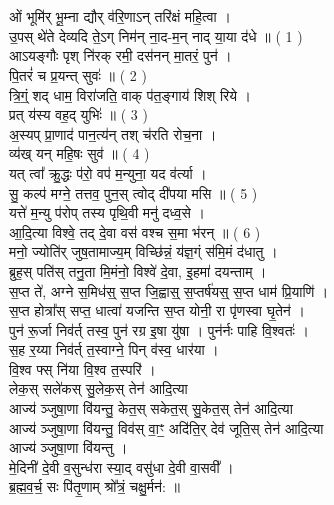 \section{}
ओं भूमि॑र् भू॒म्ना द्यौर् व॑रि॒णाऽन् तरि॑क्षं महि॒त्वा ।\\
उ॒पस् थे॑ते देव्यदि ते॒ऽग् निम॑न् ना॒द-म॒न् नाद् या॒या द॑धे ॥   ( 1 )\\
आऽयङ्गौः पृश् नि॑रक् रमी॒ दस॑नन् मा॒तरं॒ पुन॑ ।\\
पि॒तरं॑ च प्र॒यन्त् सुवः॑ ॥ ( 2 )\\
त्रि॒ग्ं॒ शद् धाम॒ विरा॑जति॒ वाक् प॑त॒ङ्गाय॑ शिश् रिये ।\\
प्रत् य॑स्य वह॒द् युभिः॑ ॥ ( 3 )\\
अ॒स्यप् प्रा॒णाद॑ पान॒त्य॑न् तश् च॑रति रोच॒ना ।\\
व्य॑ख् यन् महि॒षः सुव॑ ॥ ( 4 )\\
यत् त्वा᳚ क्रु॒द्धः प॑रो॒ वप॑ म॒न्युना॒ यद व॑र्त्या ।\\
सु॒ कल्प॑ मग्ने॒ तत्तव॒ पुन॒स् त्वोद् दी॑पया मसि ॥ ( 5 )\\
यत्ते॑ म॒न्यु प॑रोप् तस्य पृथि॒वी मनु॑ दध्व॒से ।\\
आ॒दि॒त्या विश्वे॒ तद् दे॒वा वस॑ वश्च स॒मा भ॑रन् ॥ ( 6 )\\
मनो॒ ज्योति॑र् जुष॒तामाज्य॒म् विच्छि॑न्नं॒ य॑ज्ञ॒ग्ं स॑मि॒मं द॑धातु ।\\
ब्रुह॒स् पति॑स् तनु॒ता मि॒मंनो॒ विश्वे॑ दे॒वा, इ॒हमा॑ दयन्ताम् ।\\
स॒प्त ते॑, अग्ने स॒मिध॑स्॒ स॒प्त जि॒ह्वास्॒ स॒प्तर्ष॑यस्॒ स॒प्त धाम॑ प्रि॒याणि॑ ।\\
स॒प्त होत्रा᳚स् सप्त॒ धात्वा॑ यजन्ति स॒प्त योनी॒ रा पृ॑णस्वा घृ॒तेन॑ ।\\
पुन॑ रू॒र्जा निव॑र्त् तस्व॒ पुन॑ रग्र इ॒षा यु॑षा । पुन॑र्नः पाहि वि॒श्वतः॑ ।\\
स॒ह र॒य्या निव॑र्त् त॒स्वाग्ने॒ पिन् व॑स्व॒ धार॑या । \\
{\small {}} वि॒श्व फ्स् नि॑या वि॒श्व त॒स्परि॑ ।\\
लेक॒स् सले॑कस् सु॒लेक॒स् तेन॑ आदि॒त्या \\
आज्य॑ ञ्जुषा॒णा वि॑यन्तु॒ केत॒स् सकेत॒स् सु॒केत॒स् तेन॑ आदि॒त्या\\
आज्य॑ ञ्जुषा॒णा वि॑यन्तु॒ विव॑स् वा॒ꣳ॒ अदि॑ति॒र् देव॑ जूति॒स् तेन॑ आदि॒त्या\\
आज्य॑ ञ्जुषा॒णा वि॑यन्तु ।\\
मे॒दिनी॑ दे॒वी व॒सुन्ध॑रा स्या॒द् वसु॑धा दे॒वी वा॒सवी᳚ ।\\
ब्र॒ह्म॒व॒र्च॒ सः पि॑तृ॒णाम् श्रो᳚त्रं॒ चक्षु॒र्मन॑: ॥\\
